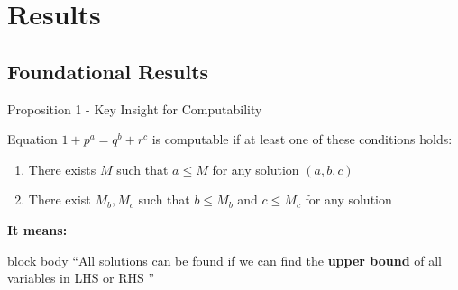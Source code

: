 \section{Results}

\subsection{Foundational Results}

\begin{frame}{Proposition 1 - Key Insight for Computability}
    \begin{proposition}
       Equation $1+p^a = q^b + r^c$ is computable if at least one of these conditions holds:
       \begin{enumerate}
           \item There exists $M$ such that $a \leq M$ for any solution $(a,b,c)$
           \item There exist $M_b, M_c$ such that $b \leq M_b$ and $c \leq M_c$ for any solution
       \end{enumerate}
    \end{proposition}
        \vspace*{0.5cm}

    \textbf{It means:}
     \begin{beamercolorbox}[rounded=true,shadow=true,sep=0.75em,wd=1\textwidth,center]{block body}
        \small
        ``All solutions can be found if we can find the \textbf{upper bound} of all variables in LHS or RHS ''
    \end{beamercolorbox}
     
    
\end{frame}
